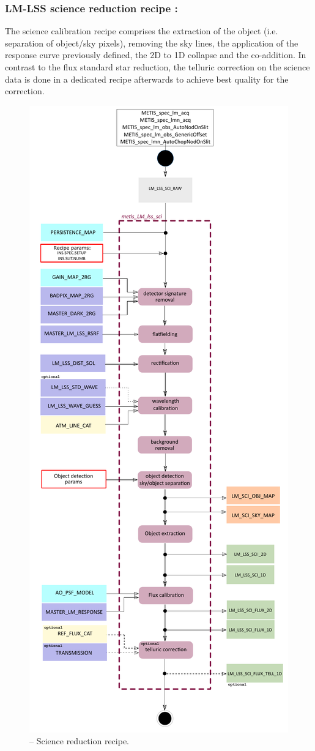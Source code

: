 \subsubsection{LM-LSS science reduction recipe :}\label{rec:lsslmsci}
The science calibration recipe comprises the extraction of the object (i.e. separation of object/sky pixels), removing the sky lines, the application of the response curve previously defined, the 2D to 1D collapse and the co-addition. In contrast to the flux standard star reduction, the telluric correction on the science data is done in a dedicated recipe afterwards to achieve best quality for the correction.
\begin{figure}[ht]
  \centering
  \includegraphics[width=0.37\textheight]{figures/metis_lm_lss_sci_v0.82.pdf}
  \caption[Recipe: ]{ --
    Science reduction recipe.}
  \label{Fig:rec_lm_lss_sci}
\end{figure}

